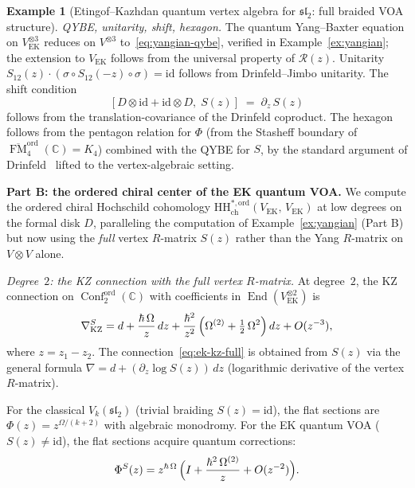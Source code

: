 \documentclass[11pt,reqno]{amsart}
\theoremstyle{definition}
\newtheorem{example}[theorem]{Example}
\theoremstyle{remark}
\newcommand{\HH}{\mathrm{HH}}
\DeclareMathOperator{\End}{End}
\DeclareMathOperator{\Conf}{Conf}
\DeclareMathOperator{\FM}{FM}
\newcommand{\CC}{\mathbb{C}}
\newcommand{\id}{\mathrm{id}}
\numberwithin{equation}{section}
\begin{document}
\begin{example}[Etingof--Kazhdan quantum vertex algebra for
$\mathfrak{sl}_2$: full braided VOA structure]
\smallskip
\noindent\emph{QYBE, unitarity, shift, hexagon.}
The quantum Yang--Baxter equation on
$V_{\mathrm{EK}}^{\otimes 3}$ reduces on $V^{\otimes 3}$
to~\eqref{eq:yangian-qybe}, verified in
Example~\ref{ex:yangian}; the extension to
$V_{\mathrm{EK}}$ follows from the universal property of
$\mathcal{R}(z)$.
Unitarity $S_{12}(z) \cdot (\sigma \circ S_{12}(-z)
\circ \sigma) = \id$ follows from Drinfeld--Jimbo unitarity.
The shift condition
\begin{equation}\label{eq:ek-shift-cond}
  [D \otimes \id + \id \otimes D,\; S(z)]
  \;=\; \partial_z\, S(z)
\end{equation}
follows from the translation-covariance of the Drinfeld
coproduct. The hexagon follows from the pentagon relation
for $\Phi$ (from the Stasheff boundary of
$\overline{\FM}_4^{\mathrm{ord}}(\CC) = K_4$) combined
with the QYBE for $S$, by the standard argument of
Drinfeld~\cite{EK96} lifted to the vertex-algebraic setting.

\medskip
\noindent
\textbf{Part B: the ordered chiral center of the EK quantum
VOA.}
We compute the ordered chiral Hochschild cohomology
$\HH^{*,\mathrm{ord}}_{\mathrm{ch}}
(V_{\mathrm{EK}},\,V_{\mathrm{EK}})$
at low degrees on the formal disk $D$, paralleling the
computation of Example~\ref{ex:yangian} (Part B) but now
using the \emph{full} vertex $R$-matrix $S(z)$ rather than
the Yang $R$-matrix on $V \otimes V$ alone.

\smallskip
\noindent\emph{Degree~$2$: the KZ connection with the full
vertex $R$-matrix.}
At degree~$2$, the KZ connection on
$\Conf_2^{\mathrm{ord}}(\CC)$ with coefficients in
$\End(V_{\mathrm{EK}}^{\otimes 2})$ is
\begin{equation}\label{eq:ek-kz-full}
  \nabla_{\mathrm{KZ}}^S
  = d + \frac{\hbar\,\Omega}{z}\,dz
  + \frac{\hbar^2}{z^2}\,
  \Bigl(\Omega^{(2)} + \tfrac{1}{2}\,\Omega^2\Bigr)\,dz
  + O(z^{-3}),
\end{equation}
where $z = z_1 - z_2$. The connection~\eqref{eq:ek-kz-full}
is obtained from $S(z)$ via the general formula
$\nabla = d + (\partial_z \log S(z))\,dz$ (logarithmic
derivative of the vertex $R$-matrix).

For the classical $V_k(\mathfrak{sl}_2)$ (trivial braiding
$S(z) = \id$), the flat sections are
$\Phi(z) = z^{\Omega/(k+2)}$ with algebraic monodromy.
For the EK quantum VOA ($S(z) \neq \id$), the flat sections
acquire quantum corrections:
\begin{equation}\label{eq:ek-flat-sections}
  \Phi^S(z)
  = z^{\hbar\,\Omega}\,
  \Bigl(I + \frac{\hbar^2\,\Omega^{(2)}}{z}
  + O(z^{-2})\Bigr).
\end{equation}


\end{example}
\end{document}
